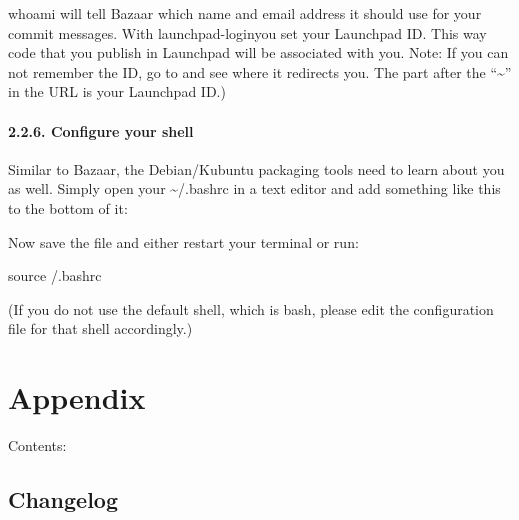 \documentclass[letterpaper,10pt,english]{sphinxmanual}
\begin{document}
whoami will tell Bazaar which name and email address it should use for your commit messages. With launchpad-loginyou set your Launchpad ID. This way code that you publish in Launchpad will be associated with you.
Note: If you can not remember the ID, go to  and see where it redirects you. The part after the “\textasciitilde{}” in the URL is your Launchpad ID.)


\subsubsection{2.2.6. Configure your shell}
\label{\detokenize{docs/packaging_guide/getting_started:configure-your-shell}}
Similar to Bazaar, the Debian/Kubuntu packaging tools need to learn about you as well. Simply open your \textasciitilde{}/.bashrc in a text editor and add something like this to the bottom of it:

\begin{sphinxVerbatim}[commandchars=\\\{\}]
 
 
\end{sphinxVerbatim}

Now save the file and either restart your terminal or run:

\begin{sphinxVerbatim}[commandchars=\\\{\}]
\PYGZdl{} source \PYGZti{}/.bashrc
\end{sphinxVerbatim}

(If you do not use the default shell, which is bash, please edit the configuration file for that shell accordingly.)


\chapter{Appendix}
\label{\detokenize{docs/appendix/appendix:appendix}}\label{\detokenize{docs/appendix/appendix::doc}}
Contents:


\section{Changelog}
\label{\detokenize{docs/appendix/changes:changelog}}\label{\detokenize{docs/appendix/changes::doc}}
\end{document}
